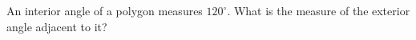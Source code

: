 An interior angle of a polygon measures $120^\circ$. What is the measure of the exterior angle adjacent to it?
